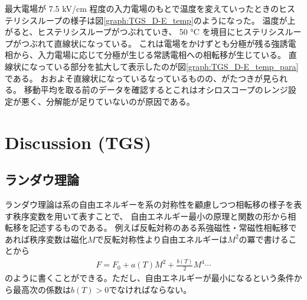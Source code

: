 \documentclass[9pt,dvipdfmx,a4paper]{jsarticle}
\begin{document}
最大電場が 7.5 kV/cm 程度の入力電場のもとで温度を変えていったときのヒステリシスループの様子は図\ref{graph:TGS_D-E_temp}のようになった。
温度が上がると、ヒステリシスループがつぶれていき、
50 \si{\degreeCelsius} を境目にヒステリシスループがつぶれて直線状になっている。
これは電場をかけずとも分極が残る強誘電相から、入力電場に応じて分極が生じる常誘電相への相転移が生じている。
直線状になっている部分を拡大して表示したのが図\ref{graph:TGS_D-E_temp_para}である。
おおよそ直線状になっているなっているものの、がたつきが見られる。
移動平均を取る前のデータを確認するとこれはオシロスコープのレンジ設定が悪く、分解能が足りていないのが原因である。

\section{Discussion (TGS)}
\subsection{ランダウ理論}
ランダウ理論は系の自由エネルギーを系の対称性を顧慮しつつ相転移の様子を表す秩序変数を用いて表すことで、
自由エネルギー最小の原理と関数の形から相転移を記述するものである。
例えば反転対称のある系強磁性・常磁性相転移であれば秩序変数は磁化\(M\)で反転対称性より自由エネルギーは\(M^2\)の冪で書けることから
\begin{align}
    F = F_0 + a(T)M^2 + \frac{b(T)}{2}M^4 \cdots
\end{align}
のように書くことができる。ただし、自由エネルギーが最小になるという条件から最高次の係数は\(b(T)>0\)でなければならない。
\end{document}
